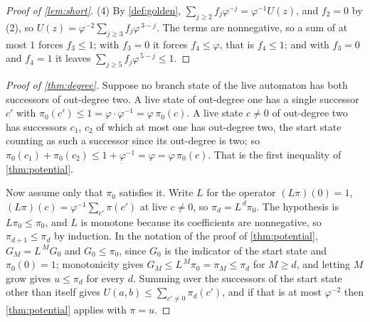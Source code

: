 \documentclass[11pt]{amsart}
\theoremstyle{definition}
\theoremstyle{remark}
\begin{document}
\begin{proof}[Proof of \cref{lem:short}]
(4) By \cref{def:golden}, $\sum_{j\ge 2}f_j\varphi^{-j}=\varphi^{-1}U(z)$, and $f_2=0$ by (2), so $U(z)=\varphi^{-2}\sum_{j\ge 3}f_j\varphi^{\,3-j}$. The terms are nonnegative, so a sum of at most $1$ forces $f_3\le 1$; with $f_3=0$ it forces $f_4\le\varphi$, that is $f_4\le 1$; and with $f_3=0$ and $f_4=1$ it leaves $\sum_{j\ge 5}f_j\varphi^{\,5-j}\le 1$.
\end{proof}

\begin{proof}[Proof of \cref{thm:degree}]
Suppose no branch state of the live automaton has both successors of out-degree two. A live state of out-degree one has a single successor $c'$ with $\pi_0(c')\le 1=\varphi\cdot\varphi^{-1}=\varphi\,\pi_0(c)$. A live state $c\neq 0$ of out-degree two has successors $c_1$, $c_2$ of which at most one has out-degree two, the start state counting as such a successor since its out-degree is two; so $\pi_0(c_1)+\pi_0(c_2)\le 1+\varphi^{-1}=\varphi=\varphi\,\pi_0(c)$. That is the first inequality of \cref{thm:potential}.

Now assume only that $\pi_0$ satisfies it. Write $L$ for the operator $(L\pi)(0)=1$, $(L\pi)(c)=\varphi^{-1}\sum_{c'}\pi(c')$ at live $c\neq 0$, so $\pi_{d}=L^{\,d}\pi_0$. The hypothesis is $L\pi_0\le\pi_0$, and $L$ is monotone because its coefficients are nonnegative, so $\pi_{d+1}\le\pi_d$ by induction. In the notation of the proof of \cref{thm:potential}, $G_M=L^{\,M}G_0$ and $G_0\le\pi_0$, since $G_0$ is the indicator of the start state and $\pi_0(0)=1$; monotonicity gives $G_M\le L^{\,M}\pi_0=\pi_M\le\pi_d$ for $M\ge d$, and letting $M$ grow gives $u\le\pi_d$ for every $d$. Summing over the successors of the start state other than itself gives $U(a,b)\le\sum_{c'\neq 0}\pi_d(c')$, and if that is at most $\varphi^{-2}$ then \cref{thm:potential} applies with $\pi=u$.
\end{proof}
\end{document}
